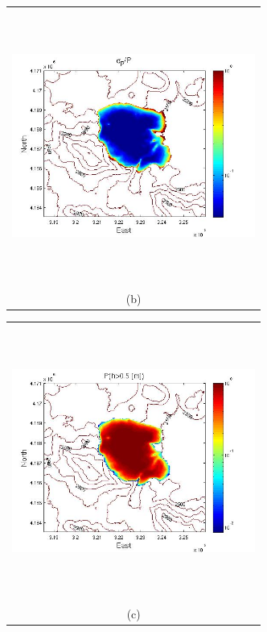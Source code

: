 \documentclass[12pt]{article}
\newcommand{\Pic}[2][0.85]{\begin{center}\texttt{[image: \#2]}
 \end{center} }
\begin{document}
\begin{figure}[H]
\begin{minipage}{0.6\textwidth}
\begin{tabular}{c}
	\includegraphics[width=8cm,height=9cm,keepaspectratio]{Mammoth_0_sigma_5m.jpg}\\
        (b)
        \end{tabular}
    \end{minipage} 
        \begin{minipage}[b]{0.6\textwidth}
        \begin{tabular}{c}
       \includegraphics[width=8cm,height=9cm,keepaspectratio]{Mammoth_3_P_5m.jpg}\\
        (c)
        \end{tabular}
    \end{minipage}
    \begin{minipage}{0.6\textwidth}
        \begin{tabular}{c}

\end{tabular}
\end{minipage}
\end{figure}
\end{document}
